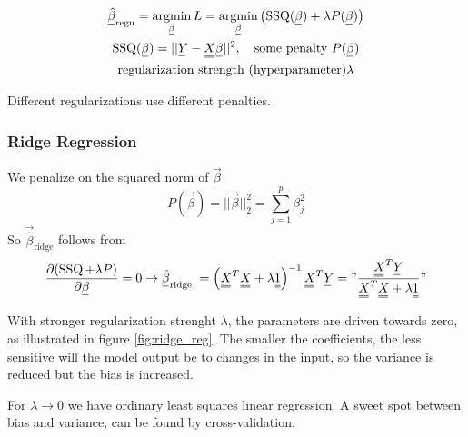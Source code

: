 
\begin{equation}
    \begin{gathered}
        \vec{\hat{\beta}}_\text{regu} = \argmin_{\vec{\beta}} L = \argmin_{\vec{\beta}} \left( \operatorname{SSQ}(\vec{\beta}) + \lambda P(\vec{\beta}) \right) \\
        \operatorname{SSQ}(\vec{\beta}) = || \vec{Y} - \mat{X} \vec{\beta} ||^2, \quad \text{some penalty } P(\vec{\beta}) \\
        \text{regularization strength (hyperparameter)} \lambda
    \end{gathered}
\end{equation}

Different regularizations use different penalties.

\subsubsection{Ridge Regression}
We penalize on the squared norm of $\vec{\beta}$
\begin{equation}
    P(\vec{\beta}) = || \vec{\beta} ||_2^2 = \sum_{j=1}^p \beta_j^2
\end{equation}
So $\vec{\hat{\beta}}_\text{ridge}$ follows from
\begin{equation}
    \frac{\partial(\operatorname{SSQ}+\lambda P)}{\partial \vec{\beta}}=0 \rightarrow \vec{\hat{\beta}}_{\text {ridge }}=\left(\mat{X}^T \mat{X}+\lambda \mat{1}\right)^{-1} \mat{X}^T \vec{Y}=" \frac{\mat{X}^T \vec{Y}}{\mat{X}^T \mat{X}+\lambda \mat{1}} "
\end{equation}

With stronger regularization strenght $\lambda$, the parameters are driven towards zero, as 
illustrated in figure \ref{fig:ridge_reg}. The smaller the coefficients, the less sensitive
will the model output be to changes in the input, so the variance is reduced but the bias is increased.

For $\lambda \rightarrow 0$ we have
ordinary least squares linear regression. A sweet spot between bias and variance,
can be found by cross-validation.

